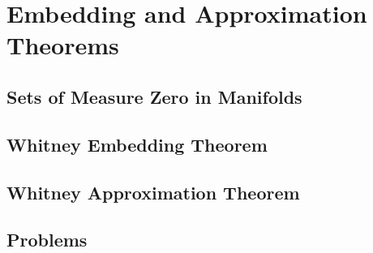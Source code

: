 \chapter{Embedding and Approximation Theorems}
\section{Sets of Measure Zero in Manifolds}
\section{Whitney Embedding Theorem}
\section{Whitney Approximation Theorem}
\section{Problems}
